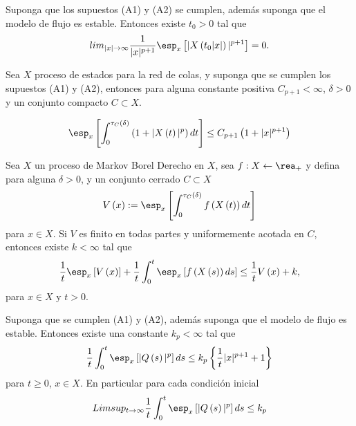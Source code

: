 \begin{Prop}\label{Prop.5.1}
Suponga que los supuestos (A1) y (A2) se cumplen, adem\'as suponga
que el modelo de flujo es estable. Entonces existe $t_{0}>0$ tal
que
\begin{equation}\label{Eq.Prop.5.1}
lim_{|x|\rightarrow\infty}\frac{1}{|x|^{p+1}}\esp_{x}\left[|X\left(t_{0}|x|\right)|^{p+1}\right]=0.
\end{equation}

\end{Prop}


\begin{Prop}
Sea $X$ proceso de estados para la red de colas, y suponga que se
cumplen los supuestos (A1) y (A2), entonces para alguna constante
positiva $C_{p+1}<\infty$, $\delta>0$ y un conjunto compacto
$C\subset X$.

\begin{equation}\label{Eq.5.4}
\esp_{x}\left[\int_{0}^{\tau_{C}\left(\delta\right)}\left(1+|X\left(t\right)|^{p}\right)dt\right]\leq
C_{p+1}\left(1+|x|^{p+1}\right)
\end{equation}
\end{Prop}

\begin{Prop}
Sea $X$ un proceso de Markov Borel Derecho en $X$, sea
$f:X\leftarrow\rea_{+}$ y defina para alguna $\delta>0$, y un
conjunto cerrado $C\subset X$
\[V\left(x\right):=\esp_{x}\left[\int_{0}^{\tau_{C}\left(\delta\right)}f\left(X\left(t\right)\right)dt\right]\]
para $x\in X$. Si $V$ es finito en todas partes y uniformemente
acotada en $C$, entonces existe $k<\infty$ tal que
\begin{equation}\label{Eq.5.11}
\frac{1}{t}\esp_{x}\left[V\left(x\right)\right]+\frac{1}{t}\int_{0}^{t}\esp_{x}\left[f\left(X\left(s\right)\right)ds\right]\leq\frac{1}{t}V\left(x\right)+k,
\end{equation}
para $x\in X$ y $t>0$.
\end{Prop}


\begin{Teo}
Suponga que se cumplen (A1) y (A2), adem\'as suponga que el modelo
de flujo es estable. Entonces existe una constante $k_{p}<\infty$
tal que
\begin{equation}\label{Eq.5.13}
\frac{1}{t}\int_{0}^{t}\esp_{x}\left[|Q\left(s\right)|^{p}\right]ds\leq
k_{p}\left\{\frac{1}{t}|x|^{p+1}+1\right\}
\end{equation}
para $t\geq0$, $x\in X$. En particular para cada condici\'on
inicial
\begin{equation}\label{Eq.5.14}
Limsup_{t\rightarrow\infty}\frac{1}{t}\int_{0}^{t}\esp_{x}\left[|Q\left(s\right)|^{p}\right]ds\leq
k_{p}
\end{equation}
\end{Teo}


